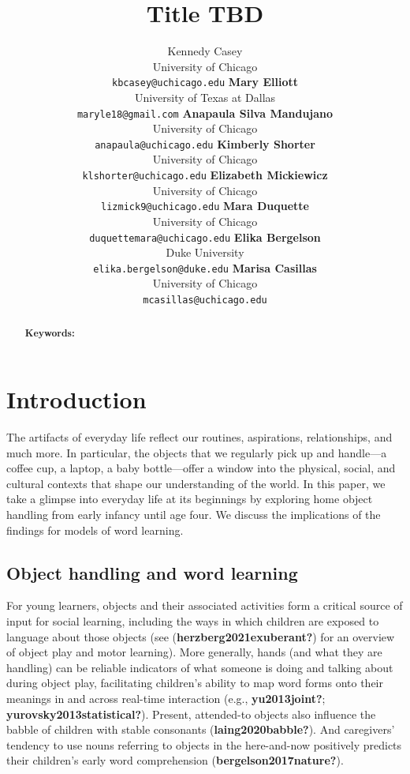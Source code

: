 \documentclass[10pt, letterpaper]{article}
\title{Title TBD}
\author{Kennedy Casey \\
        University of Chicago \\
        \texttt{kbcasey@uchicago.edu}
\And \textbf{Mary Elliott} \\
             University of Texas at Dallas \\
             \texttt{maryle18@gmail.com}
\And \textbf{Anapaula Silva Mandujano} \\
             University of Chicago \\
             \texttt{anapaula@uchicago.edu}   
\And \textbf{Kimberly Shorter} \\
             University of Chicago \\
             \texttt{klshorter@uchicago.edu}
\AND \textbf{Elizabeth Mickiewicz} \\
             University of Chicago \\
             \texttt{lizmick9@uchicago.edu}         
\And \textbf{Mara Duquette} \\
             University of Chicago \\
             \texttt{duquettemara@uchicago.edu}
\And \textbf{Elika Bergelson} \\
             Duke University \\
             \texttt{elika.bergelson@duke.edu}
\And \textbf{Marisa Casillas} \\
             University of Chicago \\
             \texttt{mcasillas@uchicago.edu}}
\begin{document}
\maketitle

\begin{abstract}


\textbf{Keywords:}

\end{abstract}

\hypertarget{introduction}{%
\section{Introduction}\label{introduction}}

The artifacts of everyday life reflect our routines, aspirations,
relationships, and much more. In particular, the objects that we
regularly pick up and handle---a coffee cup, a laptop, a baby
bottle---offer a window into the physical, social, and cultural contexts
that shape our understanding of the world. In this paper, we take a
glimpse into everyday life at its beginnings by exploring home object
handling from early infancy until age four. We discuss the implications
of the findings for models of word learning.

\hypertarget{object-handling-and-word-learning}{%
\subsection{Object handling and word
learning}\label{object-handling-and-word-learning}}

For young learners, objects and their associated activities form a
critical source of input for social learning, including the ways in
which children are exposed to language about those objects (see
(\textbf{herzberg2021exuberant?}) for an overview of object play and
motor learning). More generally, hands (and what they are handling) can
be reliable indicators of what someone is doing and talking about during
object play, facilitating children's ability to map word forms onto
their meanings in and across real-time interaction (e.g.,
\textbf{yu2013joint?}; \textbf{yurovsky2013statistical?}). Present,
attended-to objects also influence the babble of children with stable
consonants (\textbf{laing2020babble?}). And caregivers' tendency to use
nouns referring to objects in the here-and-now positively predicts their
children's early word comprehension (\textbf{bergelson2017nature?}).
\end{document}
